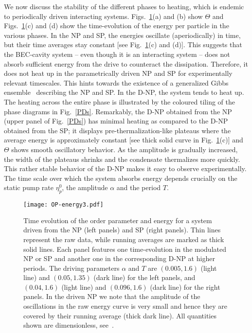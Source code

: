 \documentclass[aps,prl,twocolumn,superscriptaddress,groupedaddress]{revtex4}  %
\begin{document}
{{We now discuss the stability of the different phases to heating, which is endemic to periodically driven interacting systems.  
Figs.~\ref{energy-profiles}(a) and (b) show $\Theta$ and Figs.~\ref{energy-profiles}(c) and (d) show the time-evolution of the energy per particle  in the various phases. 
In the NP and SP, the energies oscillate (aperiodically) in time, but their time averages stay constant [see Fig.~\ref{energy-profiles}(c) and (d)].  
This suggests that the BEC-cavity system -- even though it is an interacting system -- does not absorb sufficient energy from the drive to counteract the dissipation. Therefore, it does not heat up 
in the parametrically driven NP and SP for experimentally relevant timescales.
This hints towards the existence of a generalized Gibbs ensemble~\cite{LangenRev, Schmiedmayer_Gibbs} describing the NP and SP. 
In the D-NP, the system tends to heat up. The heating across the entire phase is illustrated by the coloured tiling of the phase diagrams in Fig.~\ref{PDs}.
Remarkably, the D-NP obtained from the NP (upper panel of Fig.~\ref{PDs}) has minimal heating as compared to the D-NP obtained from the SP; it displays pre-thermalization-like plateaus 
where the average energy is approximately constant [see thick solid curve in Fig.~\ref{energy-profiles}(c)] and $\Theta$ shows smooth oscillatory behavior. 
As the amplitude is gradually increased, the width of the plateaus shrinks and the condensate thermalizes more quickly. This rather stable behavior of the D-NP makes it easy to observe experimentally. 
The time scale over which the system absorbs energy depends crucially on the static pump rate $\eta_p^0$, the amplitude $\alpha$ and the period $T$.

\begin{figure}[t]
\texttt{[image: OP-energy3.pdf]}%
\caption{Time evolution of the order parameter and energy for a system driven from the NP (left panels) and SP (right panels). Thin lines represent the raw data, while running averages are marked 
as thick solid lines. Each panel features one time-evolution in the modulated NP or SP and another one in the corresponding D-NP at higher periods. 
The driving parameters $\alpha$ and $T$ are $(0.005, 1.6)$ (light line) and $(0.05, 1.35)$ (dark line) for the left panels, and  $(0.04, 1.6)$ (light line) and $(0.096, 1.6)$ (dark line) for the right panels.
In the driven NP we note that the amplitude of the oscillations in the raw energy curve is very small and hence they are covered by their running average (thick dark line). 
All quantities shown are dimensionless, see~\cite{supmat}. }
\label{energy-profiles}
\end{figure}

}}
\end{document}
